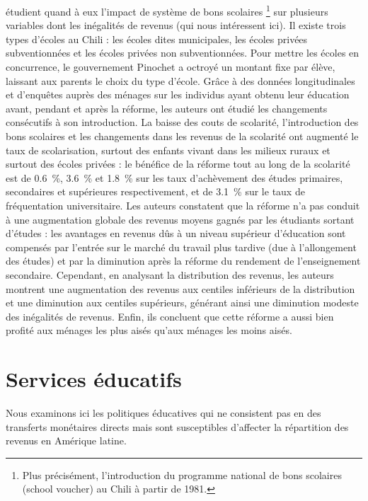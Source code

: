 \documentclass[pagesize, twoside=off, bibliography=totoc, DIV=calc, fontsize=12pt, a4paper, french]{scrartcl}
\begin{document}
 étudient quand à eux l’impact de système de bons scolaires \footnote{Plus précisément, l’introduction du programme national de bons scolaires (\og{}school voucher\fg{}) au Chili à partir de 1981.} sur plusieurs variables dont les inégalités de revenus (qui nous intéressent ici). Il existe trois types d’écoles au Chili : les écoles dites municipales, les écoles privées subventionnées et les écoles privées non subventionnées. Pour mettre les écoles en concurrence, le gouvernement Pinochet a octroyé un montant fixe par élève, laissant aux parents le choix du type d’école. Grâce à des données longitudinales et d'enquêtes auprès des ménages sur les individus ayant obtenu leur éducation avant, pendant et après la réforme, les auteurs ont étudié les changements consécutifs à son introduction. La baisse des couts de scolarité, l’introduction des bons scolaires et les changements dans les revenus de la scolarité ont augmenté le taux de scolarisation, surtout des enfants vivant dans les milieux ruraux et surtout des écoles privées : le bénéfice de la réforme tout au long de la scolarité est de \SI{0.6}{\percent}, \SI{3.6}{\percent} et \SI{1.8}{\percent} sur les taux d’achèvement des études primaires, secondaires et supérieures respectivement, et de \SI{3.1}{\percent} sur le taux de fréquentation universitaire. Les auteurs constatent que la réforme n’a pas conduit à une augmentation globale des revenus moyens gagnés par les étudiants sortant d’études : les avantages en revenus dûs à un niveau supérieur d’éducation sont compensés par l’entrée sur le marché du travail plus tardive (due à l’allongement des études) et par la diminution après la réforme du rendement de l’enseignement secondaire. Cependant, en analysant la distribution des revenus, les auteurs montrent une augmentation des revenus aux centiles inférieurs de la distribution et une diminution aux centiles supérieurs, générant ainsi une diminution modeste des inégalités de revenus. Enfin, ils concluent que cette réforme a aussi bien profité aux ménages les plus aisés qu'aux ménages les moins aisés. 

\section{Services éducatifs}

\label{sec_svc}

Nous examinons ici les politiques éducatives qui ne consistent pas en des transferts monétaires directs mais sont susceptibles d’affecter la répartition des revenus en Amérique latine. 
\end{document}
